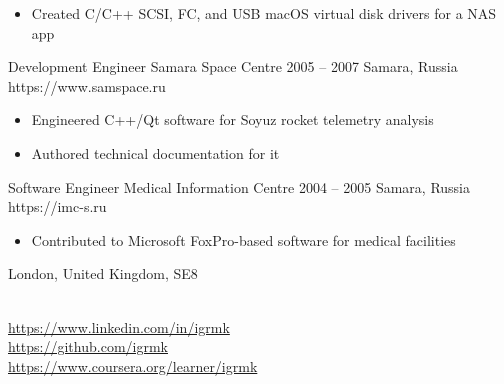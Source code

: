 \begin{paracol}{2}
        \begin{itemize}
            \item Created C/C++ SCSI, FC, and USB macOS virtual disk drivers for a NAS app
        \end{itemize}

    \cvLeftEvent
        {Development Engineer}
        {Samara Space Centre}
        {2005 -- 2007}
        {Samara, Russia}
        {https://www.samspace.ru}

        \begin{itemize}
            \item Engineered C++/Qt software for Soyuz rocket telemetry analysis
            \item Authored technical documentation for it
        \end{itemize}

    \cvLeftEvent
        {Software Engineer}
        {Medical Information Centre}
        {2004 -- 2005}
        {Samara, Russia}
        {https://imc-s.ru}

        \begin{itemize}
            \item Contributed to Microsoft FoxPro-based software for medical facilities
        \end{itemize}

\newpage
\switchcolumn
\raggedright

    London, United Kingdom, SE8\\
    \myphone\\
    \myemail

    \vspace{6pt}
    {
        \small
        \href{https://www.linkedin.com/in/igrmk}{https://www.linkedin.com/in/igrmk}\\
        \href{https://github.com/igrmk}{https://github.com/igrmk}\\
        \href{https://www.coursera.org/learner/igrmk}{https://www.coursera.org/learner/igrmk}
        \par
    }



\end{paracol}
